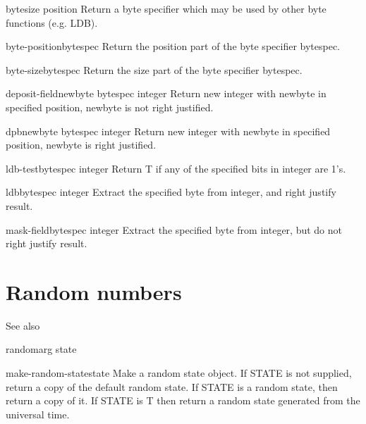 \documentclass[10pt,english]{book}
\begin{document}
\begin{function}{byte}{size position}
  Return a byte specifier which may be used by other byte functions
  (e.g. LDB).
\end{function}

\begin{function}{byte-position}{bytespec}
  Return the position part of the byte specifier bytespec.
\end{function}

\begin{function}{byte-size}{bytespec}
  Return the size part of the byte specifier bytespec.
\end{function}

\begin{function}{deposit-field}{newbyte bytespec integer}
  Return new integer with newbyte in specified position, newbyte is not right justified.
\end{function}

\begin{function}{dpb}{newbyte bytespec integer}
  Return new integer with newbyte in specified position, newbyte is right justified.
\end{function}

\begin{function}{ldb-test}{bytespec integer}
  Return T if any of the specified bits in integer are 1's.
\end{function}

\begin{accessor}{ldb}{bytespec integer}
  Extract the specified byte from integer, and right justify result.
\end{accessor}

\begin{accessor}{mask-field}{bytespec integer}
  Extract the specified byte from integer,  but do not right justify result.
\end{accessor}

\section{Random numbers}
\label{sec:random-numbers}

See also 

\begin{function}{random}{arg \op state}
  
\end{function}

\begin{function}{make-random-state}{\op state}
  Make a random state object. If STATE is not supplied, return a copy
  of the default random state. If STATE is a random state, then return a
  copy of it. If STATE is T then return a random state generated from
  the universal time.
\end{function}
\end{document}

